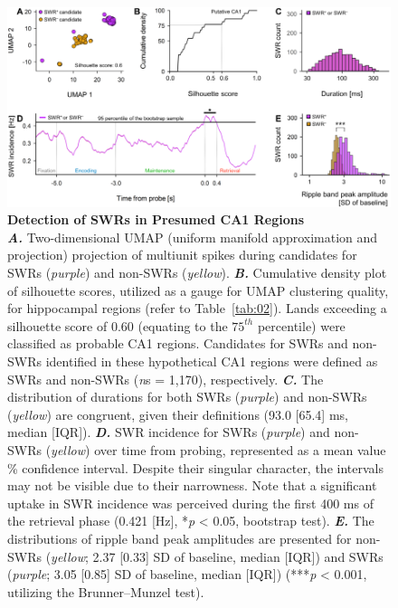 \documentclass[final,3p,times,twocolumn]{elsarticle}
\begin{document}
        \clearpage
        \begin{figure}[ht]
        	\centering
            \includegraphics[width=1\textwidth]{./src/figures/.png/Figure_ID_04.png}
        	\caption{\textbf{
Detection of SWRs in Presumed CA1 Regions
}
\smallskip
\\
\textbf{\textit{A.}} Two-dimensional UMAP (uniform manifold approximation and projection) projection of multiunit spikes during candidates for SWRs (\textit{purple}) and non-SWRs (\textit{yellow})\cite{mcinnes_umap_2018}. \textbf{\textit{B.}}  Cumulative density plot of silhouette scores, utilized as a gauge for UMAP clustering quality, for hippocampal regions (refer to Table~\ref{tab:02}). Lands exceeding a silhouette score of 0.60 (equating to the $75^{th}$ percentile) were classified as probable CA1 regions. Candidates for SWRs and non-SWRs identified in these hypothetical CA1 regions were defined as SWRs and non-SWRs (\textit{n}s = 1,170), respectively\cite{rousseeuw_silhouettes_1987}. \textbf{\textit{C.}}  The distribution of durations for both SWRs (\textit{purple}) and non-SWRs (\textit{yellow}) are congruent, given their definitions (93.0 [65.4] ms, median [IQR])\cite{girardeau_selective_2009}\cite{norman_hippocampal_2021}. \textbf{\textit{D.}}  SWR incidence for SWRs (\textit{purple}) and non-SWRs (\textit{yellow}) over time from probing, represented as a mean value \% confidence interval. Despite their singular character, the intervals may not be visible due to their narrowness. Note that a significant uptake in SWR incidence was perceived during the first 400 ms of the retrieval phase (0.421 [Hz], *\textit{p} < 0.05, bootstrap test)\cite{buzsaki_hippocampal_2015}\cite{ego-stengel_disruption_2010}\cite{fernandez-ruiz_long-duration_2019}. \textbf{\textit{E.}}  The distributions of ripple band peak amplitudes are presented for non-SWRs (\textit{yellow}; 2.37 [0.33] SD of baseline, median [IQR]) and SWRs (\textit{purple}; 3.05 [0.85] SD of baseline, median [IQR]) (***\textit{p} < 0.001, utilizing the Brunner--Munzel test)\cite{norman_hippocampal_2019}\cite{diba_forward_2007}\cite{liu_consensus_2022}.
}
        	\label{fig:04}
        \end{figure}
\end{document}
